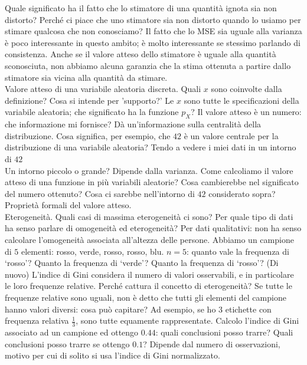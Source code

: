 \documentclass{article}
\begin{document}
    Quale significato ha il fatto che lo stimatore di una quantità ignota sia non distorto? Perché ci piace che uno stimatore sia non distorto quando lo usiamo per stimare
    qualcosa che non conosciamo? Il fatto che lo MSE sia uguale alla varianza è poco interessante in questo ambito; è molto interessante se stessimo parlando di consistenza.
    Anche se il valore atteso dello stimatore è uguale alla quantità sconosciuta, non abbiamo alcuna garanzia che la stima ottenuta a partire dallo stimatore sia vicina alla
    quantità da stimare. \\
    Valore atteso di una variabile aleatoria discreta. Quali $ x $ sono coinvolte dalla definizione? Cosa si intende per 'supporto?' Le $ x $ sono tutte le specificazioni della
    variabile aleatoria; che significato ha la funzione $ p_X $? Il valore atteso è un numero: che informazione mi fornisce? Dà un'informazione sulla centralità della 
    distribuzione. Cosa significa, per esempio, che $ 42 $ è un valore centrale per la distribuzione di una variabile aleatoria? Tendo a vedere i miei dati in un intorno di
    $ 42 $ \\
    Un intorno piccolo o grande? Dipende dalla varianza. Come calcoliamo il valore atteso di una funzione in più variabili aleatorie? Cosa cambierebbe nel significato del
    numero ottenuto? Cosa ci sarebbe nell'intorno di $ 42 $ considerato sopra? \\
    Proprietà formali del valore atteso. \\
    Eterogeneità. Quali casi di massima eterogeneità ci sono? Per quale tipo di dati ha senso parlare di omogeneità ed eterogeneità? Per dati qualitativi: non ha senso
    calcolare l'omogeneità associata all'altezza delle persone. Abbiamo un campione di $ 5 $ elementi: rosso, verde, rosso, rosso, blu. $ n = 5 $: quanto vale la frequenza di
    ‘rosso’? Quanto la frequenza di ‘verde’? Quanto la frequenza di ‘rosso’? (Di nuovo) L'indice di Gini considera il numero di valori osservabili, e in particolare le loro
    frequenze relative. Perché cattura il concetto di eterogeneità? Se tutte le frequenze relative sono uguali, non è detto che tutti gli elementi del campione hanno valori
    diversi: cosa può capitare? Ad esempio, se ho $ 3 $ etichette con frequenza relativa $ \frac{ 1 }{ 3 } $, sono tutte equamente rappresentate. Calcolo l'indice di Gini
    associato ad un campione ed ottengo $ 0.44 $: quali conclusioni posso trarre? Quali conclusioni posso trarre se ottengo $ 0.1 $? Dipende dal numero di osservazioni, motivo
    per cui di solito si usa l'indice di Gini normalizzato. \\
    
\end{document}
